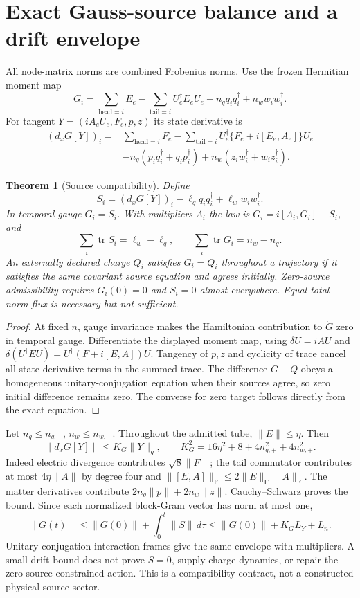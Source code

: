 \documentclass[11pt,a4paper]{article}
\newtheorem{theorem}{Theorem}\newtheorem{lemma}[theorem]{Lemma}
\newcommand{\tr}{\operatorname{tr}}\newcommand{\Rea}{\operatorname{Re}}\newcommand{\Om}{\mathcal O_*}\newcommand{\F}{\mathrm F}
\begin{document}
\section{Exact Gauss-source balance and a drift envelope}
All node-matrix norms are combined Frobenius norms. Use the frozen Hermitian moment map
\[
G_i=\sum_{\mathrm{head}=i}E_e-\sum_{\mathrm{tail}=i}U_e^\dagger E_eU_e
-n_q q_iq_i^\dagger+n_w w_iw_i^\dagger.
\]
For tangent $Y=(iA_eU_e,F_e,p,z)$ its state derivative is
\begin{align*}
(d_xG[Y])_i={}&\sum_{\mathrm{head}=i}F_e
-\sum_{\mathrm{tail}=i}U_e^\dagger\{F_e+i[E_e,A_e]\}U_e\\
&-n_q(p_iq_i^\dagger+q_ip_i^\dagger)
+n_w(z_iw_i^\dagger+w_iz_i^\dagger).
\end{align*}
\begin{theorem}[Source compatibility]\label{th:gauss}
Define
\[
\boxed{S_i=(d_xG[Y])_i-\ell_q q_iq_i^\dagger+\ell_w w_iw_i^\dagger.}
\]
In temporal gauge $\dot G_i=S_i$. With multipliers $\Lambda_i$ the law is $\dot G_i=i[\Lambda_i,G_i]+S_i$, and
\[
\sum_i\tr S_i=\ell_w-\ell_q,\qquad
\sum_i\tr G_i=n_w-n_q.
\]
An externally declared charge $Q_i$ satisfies $G_i=Q_i$ throughout a trajectory if it satisfies the same covariant source equation and agrees initially. Zero-source admissibility requires $G_i(0)=0$ and $S_i=0$ almost everywhere. Equal total norm flux is necessary but not sufficient.
\end{theorem}
\begin{proof}
At fixed $n$, gauge invariance makes the Hamiltonian contribution to $\dot G$ zero in temporal gauge. Differentiate the displayed moment map, using $\delta U=iAU$ and $\delta(U^\dagger EU)=U^\dagger(F+i[E,A])U$. Tangency of $p,z$ and cyclicity of trace cancel all state-derivative terms in the summed trace. The difference $G-Q$ obeys a homogeneous unitary-conjugation equation when their sources agree, so zero initial difference remains zero. The converse for zero target follows directly from the exact equation.
\end{proof}
Let $n_q\le n_{q,+}$, $n_w\le n_{w,+}$. Throughout the admitted tube, $\|E\|\le\eta$. Then
\[
\|d_xG[Y]\|\le K_G\|Y\|_g,\qquad
K_G^2=16\eta^2+8+4n_{q,+}^2+4n_{w,+}^2.
\]
Indeed electric divergence contributes $\sqrt8\|F\|$; the tail commutator contributes at most $4\eta\|A\|$ by degree four and $\|[E,A]\|_\F\le2\|E\|_\F\|A\|_\F$. The matter derivatives contribute $2n_q\|p\|+2n_w\|z\|$. Cauchy--Schwarz proves the bound. Since each normalized block-Gram vector has norm at most one,
\[
\boxed{\|G(t)\|\le\|G(0)\|+\int_0^t\|S\|\,d\tau
\le\|G(0)\|+K_GL_Y+L_n.}
\]
Unitary-conjugation interaction frames give the same envelope with multipliers. A small drift bound does not prove $S=0$, supply charge dynamics, or repair the zero-source constrained action. This is a compatibility contract, not a constructed physical source sector.
\newpage
\end{document}
